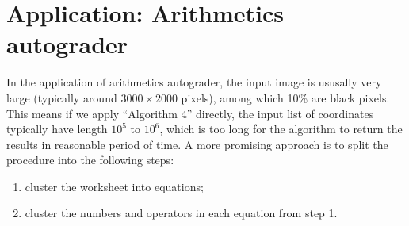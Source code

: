 
\section{Application: Arithmetics autograder}
In the application of arithmetics autograder, the input image is ususally very large (typically around \(3000\times2000\) pixels), among which 10\% are black pixels.
This means if we apply ``Algorithm 4'' directly, the input list of coordinates typically have length \(10^5\) to \(10^6\), which is too long for the algorithm to return the results in reasonable period of time.
A more promising approach is to split the procedure into the following steps:
\begin{enumerate}
    \vspace{-0.5em}
    \item cluster the worksheet into equations;
    \vspace{-0.5em}
    \item cluster the numbers and operators in each equation from step 1.
\end{enumerate}


